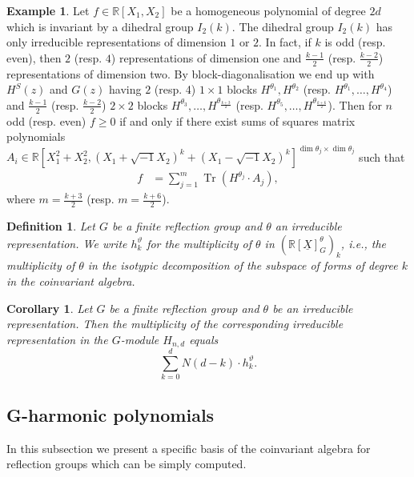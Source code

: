 \documentclass[11pt,a4paper]{amsart}
\numberwithin{equation}{section}
\newtheorem{cor}[thm]{Corollary}
\newtheorem{definition}[thm]{Definition}
\theoremstyle{definition}
\newtheorem{example}[thm]{Example}
\newcommand{\R}{\mathbb{R}}
\DeclareMathOperator{\Tr}{Tr}
\numberwithin{thm}{section}
\theoremstyle{break}
\numberwithin{subcase}{case}
\begin{document}
\begin{example}
Let $f\in\R[X_1,X_2]$ be a homogeneous polynomial of degree $2d$ which is invariant by a dihedral group $I_2{(k)}$. The dihedral group $I_2{(k)}$ has only irreducible representations of dimension $1$ or $2$. In fact, if $k$ is odd (resp. even), then $2$ (resp. $4$) representations of dimension one and $\frac{k-1}{2}$ (resp. $\frac{k-2}{2}$) representations of dimension two. By block-diagonalisation we end up with $H^S(z)$ and $G(z)$ having $2$ (resp. 4) $1 \times 1$ blocks $H^{\theta_1},H^{\theta_2}$ (resp. $H^{\theta_1},\ldots,H^{\theta_4}$) and $\frac{k-1}{2}$ (resp. $\frac{k-2}{2}$) $2 \times 2$ blocks $H^{\theta_3},\ldots,H^{\theta_{\frac{k+3}{2}}}$ (resp. $H^{\theta_5},\ldots,H^{\theta_\frac{k+6}{2}}$). Then for $n$ odd (resp. even) $f\geq 0$ if and only if there exist sums of squares matrix polynomials $A_i\in{ \R[X_1^2+X_2^2, (X_1+\sqrt{-1}X_2)^k+(X_1-\sqrt{-1}X_2)^k]}^{\dim \theta_j\times\dim\theta_j}$  
such that \begin{align*}
    f & = \sum_{j=1}^{m} \Tr \left( H^{\theta_j} \cdot A_j \right),
\end{align*}
where $m = \frac{k+3}{2}$ (resp. $m =\frac{k+6}{2}$).

\end{example}

\begin{definition}
Let $G$ be a finite reflection group and $\theta$ an irreducible representation. We write $h_k^{\vartheta}$ for the multiplicity of $\theta$ in $(\R[\underline{X}]_G^{\theta})_k$, i.e., the multiplicity of $\theta$ in the isotypic decomposition of the subspace of forms of degree $k$ in the coinvariant algebra.
\end{definition}

\begin{cor}\label{cor:bound}
Let $G$ be a finite reflection group and $\theta$ be an irreducible representation. Then the multiplicity of the corresponding irreducible representation in the $G$-module $H_{n,d}$ equals  
$$\sum_{k=0}^dN(d-k)\cdot h^{\vartheta}_k.$$
\end{cor}





\subsection{G-harmonic polynomials}
In this subsection we present a specific basis of the coinvariant algebra for reflection groups which can be simply computed.
\end{document}
